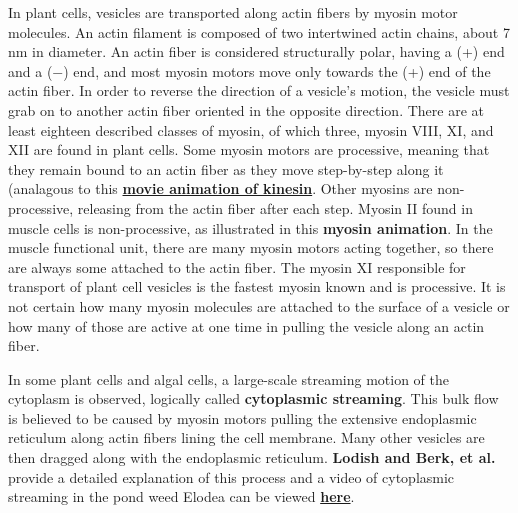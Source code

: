 \documentclass{../lab}
\begin{document}
In plant cells, vesicles are transported along actin fibers by myosin motor molecules. An actin filament is composed of two intertwined actin chains, about 7 nm in diameter. An actin fiber is considered structurally polar, having a (+) end and a ($-$) end, and most myosin motors move only towards the (+) end of the actin fiber. In order to reverse the direction of a vesicle's motion, the vesicle must grab on to another actin fiber oriented in the opposite direction. There are at least eighteen described classes of myosin, of which three, myosin VIII, XI, and XII are found in plant cells. Some myosin motors are processive, meaning that they remain bound to an actin fiber as they move step-by-step along it (analagous to this \href{https://berkeley-physics111b.github.io/assets/pdf/oldwebsitestructure/motionbykinesin.mp4}{\textbf{movie animation of kinesin}}. Other myosins are non-processive, releasing from the actin fiber after each step. Myosin II found in muscle cells is non-processive, as illustrated in this \textbf{myosin animation}. In the muscle functional unit, there are many myosin motors acting together, so there are always some attached to the actin fiber. The myosin XI responsible for transport of plant cell vesicles is the fastest myosin known and is processive. It is not certain how many myosin molecules are attached to the surface of a vesicle or how many of those are active at one time in pulling the vesicle along an actin fiber.

In some plant cells and algal cells, a large-scale streaming motion of the cytoplasm is observed, logically called \textbf{cytoplasmic streaming}. This bulk flow is believed to be caused by myosin motors pulling the extensive endoplasmic reticulum along actin fibers lining the cell membrane. Many other vesicles are then dragged along with the endoplasmic reticulum. \textbf{Lodish and Berk, et al.} provide a detailed explanation of this process and a video of cytoplasmic streaming in the pond weed Elodea can be viewed \href{https://berkeley-physics111b.github.io/assets/pdf/oldwebsitestructure/Cytoplasmic_Streaming_Elodea.mov}{\textbf{here}}.
\end{document}
